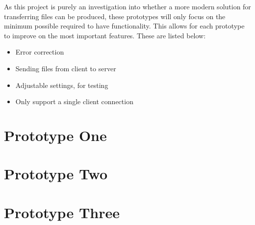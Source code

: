 As this project is purely an investigation into whether a more modern solution for transferring files can be produced, these prototypes will only focus on the minimum possible required to have functionality. This allows for each prototype to improve on the most important features. These are listed below:

\begin{itemize}
    \item Error correction
    \item Sending files from client to server
    \item Adjustable settings, for testing
    \item Only support a single client connection
\end{itemize}


\section{Prototype One}

\section{Prototype Two}

\section{Prototype Three}
